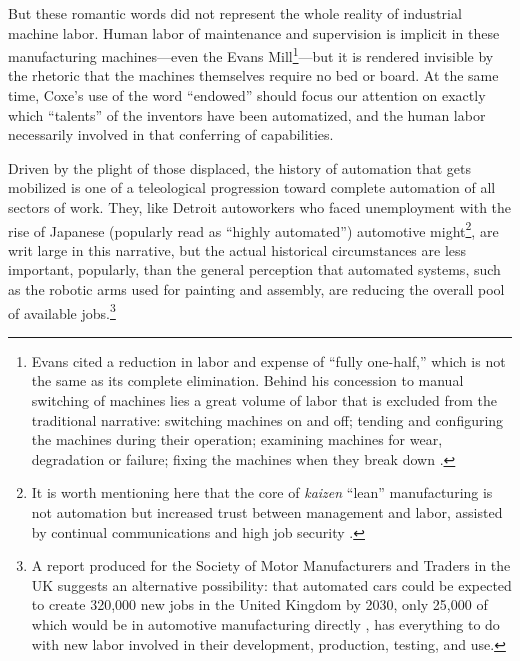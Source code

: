 But these romantic words did not represent the whole reality of
industrial machine labor. Human labor of
maintenance and supervision is implicit in these manufacturing
machines---even the Evans Mill\footnote{Evans cited a reduction in
  labor and expense of ``fully one-half,'' which is not the same as
  its complete elimination. Behind his concession to manual switching
  of machines lies a great volume of labor that is excluded
  from the traditional narrative: switching machines on and off;
  tending and configuring the machines during their operation; examining machines for
  wear, degradation or failure; fixing the machines when they break
  down \cite{evansMillguide}.}---but it is rendered invisible by the
rhetoric that the 
machines themselves require no bed or board. At the same time, Coxe's
use of the word ``endowed'' should focus our attention on exactly which
``talents'' of the inventors have been automatized, and the human
labor necessarily involved in that conferring of capabilities. 


Driven by the plight of those displaced, the history of
automation that gets mobilized is one of a teleological progression
toward complete automation of all sectors of work. They, like Detroit
autoworkers who faced unemployment with the rise of
Japanese (popularly read as ``highly automated'') automotive
might\footnote{It is worth mentioning here that the core of
  \emph{kaizen} ``lean'' manufacturing is not automation but increased trust between management
  and labor, assisted by continual communications and high job
  security \cite[p. 198--199]{nyeAmericas}.}, are writ large in this
narrative, but the actual historical 
circumstances are less important, popularly, than the general
perception that automated 
systems, such as the robotic arms used for painting and assembly, are
reducing the overall pool of available jobs.\footnote{A report produced for the Society of Motor
Manufacturers and Traders in the UK suggests an alternative
possibility: that automated cars could be 
expected to create 320,000 new jobs in the United Kingdom by 2030, only 25,000 of
which would be in automotive manufacturing directly
\cite{toveyCreate}, has everything to do with new labor involved in their
development, production, testing, and use.}


